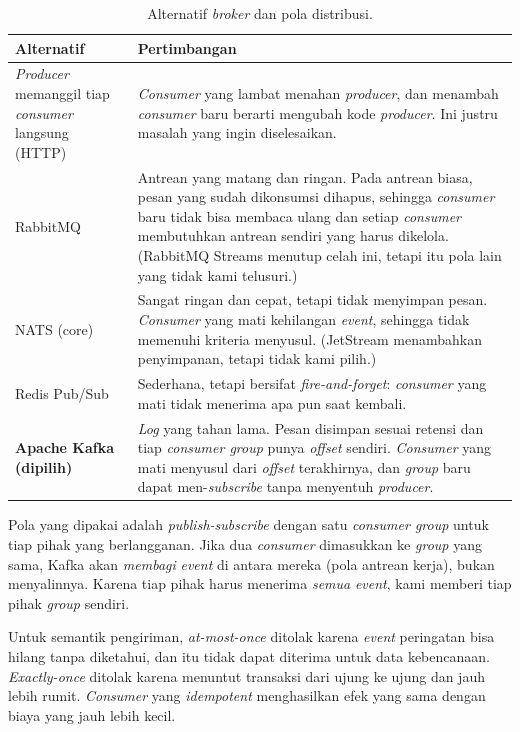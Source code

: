 \begin{table}[H]
\centering\small
\begin{tabularx}{\textwidth}{@{}L{3.7cm}Y@{}}
\toprule
\textbf{Alternatif} & \textbf{Pertimbangan}\\
\midrule
\emph{Producer} memanggil tiap \emph{consumer} langsung (HTTP) & \emph{Consumer} yang lambat menahan \emph{producer}, dan menambah \emph{consumer} baru berarti mengubah kode \emph{producer}. Ini justru masalah yang ingin diselesaikan.\\
RabbitMQ & Antrean yang matang dan ringan. Pada antrean biasa, pesan yang sudah dikonsumsi dihapus, sehingga \emph{consumer} baru tidak bisa membaca ulang dan setiap \emph{consumer} membutuhkan antrean sendiri yang harus dikelola. (RabbitMQ Streams menutup celah ini, tetapi itu pola lain yang tidak kami telusuri.)\\
NATS (core) & Sangat ringan dan cepat, tetapi tidak menyimpan pesan. \emph{Consumer} yang mati kehilangan \emph{event}, sehingga tidak memenuhi kriteria menyusul. (JetStream menambahkan penyimpanan, tetapi tidak kami pilih.)\\
Redis Pub/Sub & Sederhana, tetapi bersifat \emph{fire-and-forget}: \emph{consumer} yang mati tidak menerima apa pun saat kembali.\\
\textbf{Apache Kafka (dipilih)} & \emph{Log} yang tahan lama. Pesan disimpan sesuai retensi dan tiap \emph{consumer group} punya \emph{offset} sendiri. \emph{Consumer} yang mati menyusul dari \emph{offset} terakhirnya, dan \emph{group} baru dapat men-\emph{subscribe} tanpa menyentuh \emph{producer}.\\
\bottomrule
\end{tabularx}
\caption{Alternatif \emph{broker} dan pola distribusi.}
\end{table}

Pola yang dipakai adalah \emph{publish-subscribe} dengan satu \emph{consumer group} untuk tiap pihak yang berlangganan. Jika dua
\emph{consumer} dimasukkan ke \emph{group} yang sama, Kafka akan \emph{membagi} \emph{event} di antara mereka (pola antrean kerja), bukan
menyalinnya. Karena tiap pihak harus menerima \emph{semua} \emph{event}, kami memberi tiap pihak \emph{group} sendiri.

Untuk semantik pengiriman, \emph{at-most-once} ditolak karena \emph{event} peringatan bisa hilang tanpa diketahui, dan itu tidak
dapat diterima untuk data kebencanaan. \emph{Exactly-once} ditolak karena menuntut transaksi dari ujung ke ujung dan jauh
lebih rumit. \emph{Consumer} yang \emph{idempotent} menghasilkan efek yang sama dengan biaya yang jauh lebih kecil.


